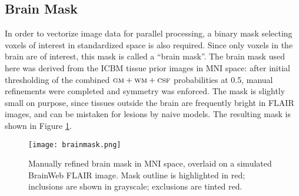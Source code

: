 \subsection{Brain Mask}\label{ss:brainmask}
In order to vectorize image data for parallel processing, a binary mask selecting voxels of interest in standardized space is also required. Since only voxels in the brain are of interest, this mask is called a ``brain mask''. The brain mask used here was derived from the ICBM tissue prior images \cite{Mazziotta2001} in MNI space: after initial thresholding of the combined $\textsc{gm}+\textsc{wm}+\textsc{csf}$ probabilities at 0.5, manual refinements were completed and symmetry was enforced. The mask is slightly small on purpose, since tissues outside the brain are frequently bright in FLAIR images, and can be mistaken for lesions by naive models. The resulting mask is shown in Figure \ref{fig:brainmask}.
\begin{figure}
  \centering
  \texttt{[image: brainmask.png]}
  \caption{Manually refined brain mask in MNI space, overlaid on a simulated BrainWeb FLAIR image. Mask outline is highlighted in red; inclusions are shown in grayscale; exclusions are tinted red.}
  \label{fig:brainmask}
\end{figure}
